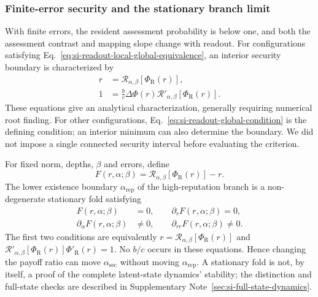 \documentclass[fleqn,10pt]{wlscirep}
\begin{document}
\subsubsection{Finite-error security and the stationary branch limit}
\label{sec:si-readout-branches}

With finite errors, the resident assessment probability is below one, and both the assessment contrast and mapping slope change with readout. For configurations satisfying Eq.~\eqref{eq:si-readout-local-global-equivalence}, an interior security boundary is characterized by
\begin{equation}
\begin{aligned}
r&=\mathcal R_{\alpha,\beta}[\Phi_{\mathrm R}(r)],\\
1&=\frac bc\Delta\Phi(r)\mathcal R'_{\alpha,\beta}[\Phi_{\mathrm R}(r)].
\end{aligned}
\label{eq:si-readout-security-equations}
\end{equation}
These equations give an analytical characterization, generally requiring numerical root finding. For other configurations, Eq.~\eqref{eq:si-readout-global-condition} is the defining condition; an interior minimum can also determine the boundary. We did not impose a single connected security interval before evaluating the criterion.

For fixed norm, depths, $\beta$ and errors, define
\begin{equation}
F(r,\alpha;\beta)=\mathcal R_{\alpha,\beta}[\Phi_{\mathrm R}(r)]-r.
\label{eq:si-readout-branch-residual}
\end{equation}
The lower existence boundary $\alpha_{\mathrm{rep}}$ of the high-reputation branch is a non-degenerate stationary fold satisfying
\begin{equation}
\begin{aligned}
F(r,\alpha;\beta)&=0,\qquad \partial_rF(r,\alpha;\beta)=0,\\
\partial_\alpha F(r,\alpha;\beta)&\ne0,\qquad
\partial_{rr}F(r,\alpha;\beta)\ne0.
\end{aligned}
\label{eq:si-readout-fold-conditions}
\end{equation}
The first two conditions are equivalently $r=\mathcal R_{\alpha,\beta}[\Phi_{\mathrm R}(r)]$ and $\mathcal R'_{\alpha,\beta}[\Phi_{\mathrm R}(r)]\Phi'_{\mathrm R}(r)=1$. No $b/c$ occurs in these equations. Hence changing the payoff ratio can move $\alpha_{\mathrm{sec}}$ without moving $\alpha_{\mathrm{rep}}$. A stationary fold is not, by itself, a proof of the complete latent-state dynamics' stability; the distinction and full-state checks are described in Supplementary Note~\ref{sec:si-full-state-dynamics}.
\end{document}
